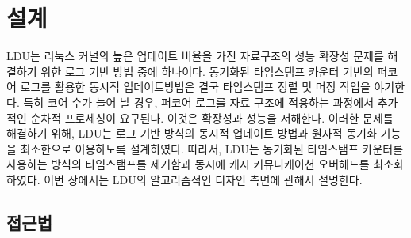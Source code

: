 \section{설계}
\label{sec:ldu}



LDU는 리눅스 커널의 높은 업데이트 비율을 가진 자료구조의 성능 확장성 문제를 
해결하기 위한 로그 기반 방법 중에 하나이다.
동기화된 타임스탬프 카운터 기반의 퍼코어 로그를 활용한 동시적 업데이트방법은 결국 
타임스탬프 정렬 및 머징 작업을 야기한다.
특히 코어 수가 늘어 날 경우, 퍼코어 로그를 자료 구조에 적용하는 과정에서 추가적인 순차적 프로세싱이 요구된다.
이것은 확장성과 성능을 저해한다. 
이러한 문제를 해결하기 위해, LDU는 로그 기반 방식의 동시적 업데이트 방법과 
원자적 동기화 기능을 최소한으로 이용하도록 설계하였다.
따라서, LDU는 동기화된 타임스탬프 카운터를 사용하는 방식의 타임스탬프를
제거함과 동시에 캐시 커뮤니케이션 오버헤드를 최소화하였다.
이번 장에서는 LDU의 알고리즘적인 디자인 측면에 관해서 설명한다. 

\subsection{접근법}


